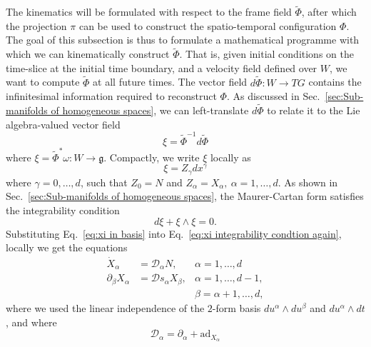 The kinematics will be formulated with respect to the frame field $\tilde{\Phi}$, after which the projection $\pi$ can be used to construct the spatio-temporal configuration $\Phi$. The goal of this subsection is thus to formulate a mathematical programme with which we can kinematically construct $\tilde{\Phi}$. That is, given initial conditions on the time-slice at the initial time boundary, and a velocity field defined over $W$, we want to compute $\tilde{\Phi}$ at all future times. The vector field $d \tilde{\Phi} : W \to TG$ contains the infinitesimal information required to reconstruct $\Phi$. As discussed in Sec.~\ref{sec:Sub-manifolds of homogeneous spaces}, we can left-translate $d \tilde{\Phi}$ to relate it to the Lie algebra-valued vector field
\begin{equation} \label{eq:xi and Phi relation}
\xi = \tilde{\Phi}^{-1} d \tilde{\Phi}
\end{equation}
where $\xi = \tilde{\Phi}^* \omega : W \to \mathfrak{g}$. Compactly, we write $\xi$ locally as
\begin{equation}
\xi = Z_\gamma d x^\gamma
\end{equation}
where $\gamma = 0, \dots, d$, such that $Z_0 = N$ and $Z_\alpha = X_\alpha,\ \alpha = 1, \dots, d$. As shown in Sec.~\ref{sec:Sub-manifolds of homogeneous spaces}, the Maurer-Cartan form satisfies the integrability condition
\begin{equation} \label{eq:xi integrability condtion again}
d \xi + \xi \wedge \xi = 0.
\end{equation}
Substituting Eq.~\ref{eq:xi in basis} into Eq.~\ref{eq:xi integrability condtion again}, locally we get the equations
\begin{subequations} \label{eq:xi integrability in terms of Xs}
\begin{align}
\dot{X}_\alpha & = \mathcal{D}_\alpha N, & \alpha = 1, \dots, d \label{eq:xi from N} \\
\partial_\beta X_\alpha  & = \mathcal{D}s_\alpha X_\beta, & \alpha = 1, \dots, d-1, \label{eq:spatial integrability conditions} \\
& & \beta = \alpha+1, \dots, d \nonumber,
\end{align}
\end{subequations}
where we used the linear independence of the $2$-form basis $d u^\alpha \wedge d u^\beta$ and $d u^\alpha \wedge dt$, and where
\begin{equation}
	\mathcal{D}_\alpha = \partial_\alpha + \text{ad}_{X_\alpha}
\end{equation}
